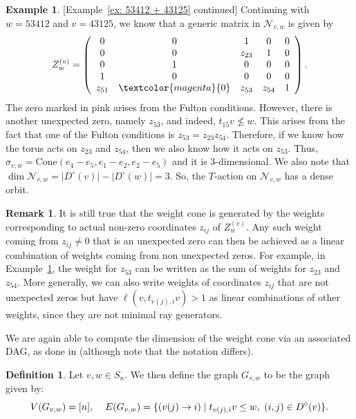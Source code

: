 \documentclass[11pt]{amsart}
\theoremstyle{definition}
\newtheorem{example}[theorem]{Example}
\theoremstyle{definition}
\newtheorem{definition}[theorem]{Definition}
\theoremstyle{definition}
\newtheorem{remark}[theorem]{Remark}
\theoremstyle{definition}
\newcommand{\Gvwt}{G_{v,w}}
\newcommand{\Nvw}{\mathcal{N}_{v,w}}
\newcommand{\Dc}{D^{\circ}}
\newcommand{\Zg}{Z^{(v)}_w}
\begin{document}
\begin{example}\label{ex: actual unexp zeros}[Example~\ref{ex: 53412 + 43125} continued]
    Continuing with $w=53412$ and $v=43125$, we know that a generic matrix in $\Nvw$ is given by
   $$\Zg = \left(\begin{array}{ccccc}
        0 & 0 & 1 & 0 & 0 \\
        0 & 0 & z_{23} & 1 & 0 \\
        0 & 1 & 0 & 0 & 0 \\
        1 & 0 & 0 & 0 & 0 \\
        z_{51} & \textcolor{magenta}{0} & z_{53} & z_{54} & 1 \\
   \end{array}\right).$$
   The zero marked in pink arises from the Fulton conditions. 
   However, there is another unexpected zero, namely $z_{53}$, and indeed, $t_{15}v \not\leq w$. 
   This arises from the fact that one of the Fulton conditions is $z_{53}=z_{23}z_{54}$. Therefore,
   if we know how the torus acts on $z_{23}$ and $z_{54}$, then we also know how it acts on $z_{53}$. Thus, $\sigma_{v,w} = \mathrm{Cone}(e_4-e_5, e_1-e_2, e_2-e_5)$ and it is $3$-dimensional. We also note that $\dim\Nvw = |\Dc(v)| - |\Dc(w)|=3$. So, the $T$-action on $\Nvw$ has a dense orbit. 
\end{example}

\begin{remark}\label{rem: corresp zeros}
It is still true that the weight cone is generated by the weights corresponding to actual non-zero coordinates $z_{ij}$ of $\Zg$. Any such weight coming from $z_{ij} \neq 0$ that is an unexpected zero can then be achieved as a linear combination of weights coming from non unexpected zeros. For example, in Example~\ref{ex: actual unexp zeros}, the weight for $z_{53}$ can be written as the sum of weights for $z_{23}$ and $z_{54}$. More generally, we can also write weights of coordinates $z_{ij}$ that are not unexpected zeros but have $\ell(v,t_{v(j),i}v)>1$ as linear combinations of other weights, since they are not minimal ray generators.
\end{remark}
\noindent We are again able to compute the dimension of the weight cone via an associated DAG, as done in \cite[Definition 4.14]{donten2021complexity} (although note that the notation differs). 
 

\begin{definition}\label{def: graph Gwv}
Let $v, w \in S_n$. We then define the graph $\Gvwt$ to be the graph given by:
    $$V(\Gvwt) = [n], \hspace{0.4cm} E(\Gvwt) = \{(v(j)\rightarrow i)\mid t_{v(j),i}v \leq w, \,\, (i,j) \in \Dc(v)  \}.$$
\end{definition}
\end{document}
